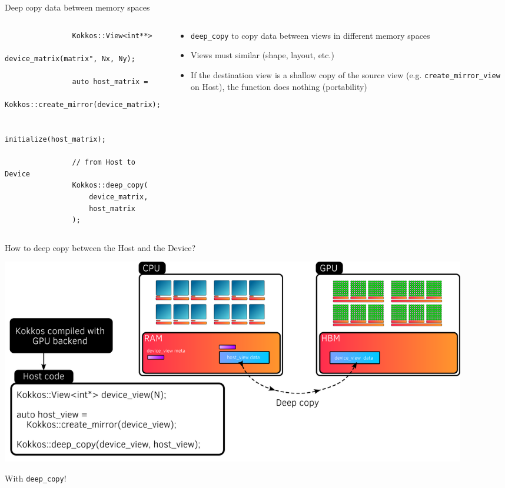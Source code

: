 \documentclass[aspectratio=169]{beamer}
\begin{document}
\begin{frame}[fragile]{Deep copy data between memory spaces}
    \begin{columns}
        \begin{column}{0.6\linewidth}
            \begin{verbatim}
                Kokkos::View<int**>
                    device_matrix(matrix", Nx, Ny);

                auto host_matrix =
                    Kokkos::create_mirror(device_matrix);

                initialize(host_matrix);

                // from Host to Device
                Kokkos::deep_copy(
                    device_matrix,
                    host_matrix
                );
            \end{verbatim}
        \end{column}
        \begin{column}{0.4\linewidth}
            \begin{itemize}
                \item \texttt{deep\_copy} to copy data between views in different memory spaces
                \item Views must similar (shape, layout, etc.)
                \item If the destination view is a shallow copy of the source view (e.g. \texttt{create\_mirror\_view} on Host), the function does nothing (portability)
            \end{itemize}
        \end{column}
    \end{columns}
\end{frame}


\begin{frame}{How to deep copy between the Host and the Device?}
    \begin{center}
        \includegraphics[width=0.9\textwidth]{host_device_deep_copy.png}
    \end{center}

     With \texttt{deep\_copy}!
\end{frame}
\end{document}
